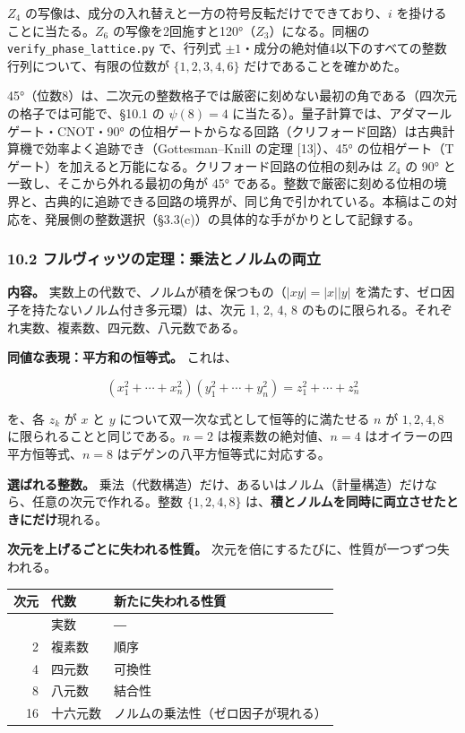 \documentclass[
  a4paper,
]{ltjsarticle}
\newcounter{none} %
\begin{document}
\(Z_4\) の写像は、成分の入れ替えと一方の符号反転だけでできており、\(i\)
を掛けることに当たる。\(Z_6\)
の写像を2回施すと120°（\(Z_3\)）になる。同梱の
\texttt{verify\_\allowbreak{}phase\_\allowbreak{}lattice.py} で、行列式
\(\pm1\)・成分の絶対値4以下のすべての整数行列について、有限の位数が
\(\{1,2,3,4,6\}\) だけであることを確かめた。

45°（位数8）は、二次元の整数格子では厳密に刻めない最初の角である（四次元の格子では可能で、§10.1
の \(\psi(8)=4\) に当たる）。量子計算では、アダマールゲート・CNOT・90°
の位相ゲートからなる回路（クリフォード回路）は古典計算機で効率よく追跡でき（Gottesman--Knill
の定理 {[}13{]}）、45° の位相ゲート（T
ゲート）を加えると万能になる。クリフォード回路の位相の刻みは \(Z_4\) の
90° と一致し、そこから外れる最初の角が 45°
である。整数で厳密に刻める位相の境界と、古典的に追跡できる回路の境界が、同じ角で引かれている。本稿はこの対応を、発展側の整数選択（§3.3(c)）の具体的な手がかりとして記録する。

\subsubsection{10.2
フルヴィッツの定理：乗法とノルムの両立}\label{ux30d5ux30ebux30f4ux30a3ux30c3ux30c4ux306eux5b9aux7406ux4e57ux6cd5ux3068ux30ceux30ebux30e0ux306eux4e21ux7acb}

\textbf{内容。} 実数上の代数で、ノルムが積を保つもの（\(|xy|=|x||y|\)
を満たす、ゼロ因子を持たないノルム付き多元環）は、次元 1, 2, 4, 8
のものに限られる。それぞれ実数、複素数、四元数、八元数である。

\textbf{同値な表現：平方和の恒等式。} これは、

\[
(x_1^2+\cdots+x_n^2)(y_1^2+\cdots+y_n^2)=z_1^2+\cdots+z_n^2
\tag{14}
\]

を、各 \(z_k\) が \(x\) と \(y\)
について双一次な式として恒等的に満たせる \(n\) が \(1,2,4,8\)
に限られることと同じである。\(n=2\) は複素数の絶対値、\(n=4\)
はオイラーの四平方恒等式、\(n=8\) はデゲンの八平方恒等式に対応する。

\textbf{選ばれる整数。}
乗法（代数構造）だけ、あるいはノルム（計量構造）だけなら、任意の次元で作れる。整数
\(\{1,2,4,8\}\)
は、\textbf{積とノルムを同時に両立させたときにだけ}現れる。

\textbf{次元を上げるごとに失われる性質。}
次元を倍にするたびに、性質が一つずつ失われる。

{\def\LTcaptype{none} %
\begin{longtable}[]{@{}rll@{}}
\toprule\noalign{}
次元 & 代数 & 新たに失われる性質 \\
\midrule\noalign{}
\endhead
\bottomrule\noalign{}
\endlastfoot
1 & 実数 & ― \\
2 & 複素数 & 順序 \\
4 & 四元数 & 可換性 \\
8 & 八元数 & 結合性 \\
16 & 十六元数 & ノルムの乗法性（ゼロ因子が現れる） \\
\end{longtable}
}
\end{document}
